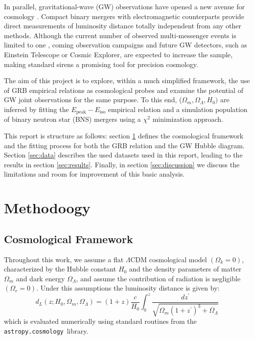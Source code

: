 \documentclass[
    aps,
    prd,
    twocolumn,
    nofootinbib,
    floatfix,
    superscriptaddress
]{revtex4-2}
\begin{document}
In parallel, gravitational-wave (GW) observations have opened a new avenue for cosmology \cite{mastrogiovanni2024}. Compact binary mergers with electromagnetic counterparts provide direct measurements of luminosity distance totally independent from any other methods. Although the current number of observed multi-messenger events is limited to one \cite{ligocollaboration2017}, coming observation campaigns \cite{salafia2025} and future GW detectors, such as Einstein Telescope or Cosmic Explorer, are expected to increase the sample, making standard sirens a promising tool for precision cosmology.

The aim of this project is to explore, within a much simplified framework, the use of GRB empirical relations as cosmological probes and examine the potential of GW joint observations for the same purpose. To this end, ($\Omega_m, \Omega_\Lambda, H_0)$ are inferred by fitting the $E_\text{peak}-E_\text{iso}$ empirical relation and a simulation population of binary neutron star (BNS) mergers using a $\chi^2$ minimization approach. 

This report is structure as follows: section \ref{sec:methodology} defines the cosmological framework and the fitting process for both the GRB relation and the GW Hubble diagram. Section \ref{sec:data} describes the used datasets used in this report, leading to the results in section \ref{sec:results}. Finally, in section \ref{sec:discussion} we discuss the limitations and room for improvement of this basic analysis.



\section{Methodoogy}\label{sec:methodology}

\subsection{Cosmological Framework}

Throughout this work, we assume a flat $\Lambda$CDM cosmological model $(\Omega_k=0)$, characterized by the Hubble constant $H_0$ and the density parameters of matter $\Omega_m$ and dark energy $\Omega_\Lambda$, and assume the contribution of radiation is negligible $(\Omega_r = 0)$. Under this assumptions the luminosity distance is given by:
$$\label{eq:dl}
d_L (z; H_0, \Omega_m, \Omega_\Lambda) = (1+z) \frac{c}{H_0}\int_0^z\frac{dz^\prime}{\sqrt{\Omega_m (1+z^\prime)^3+\Omega_\Lambda}}
$$
which is evaluated numerically using standard routines from the \verb|astropy.cosmology| library.
\end{document}
